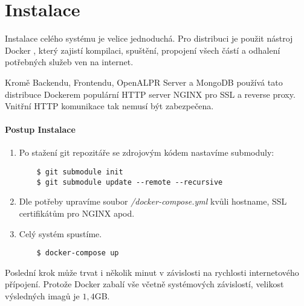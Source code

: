 
\chapter{Instalace} \label{analyza}

Instalace celého systému je velice jednoduchá. Pro distribuci je použit nástroj
Docker \citep[viz][]{DockerDocs}, který zajistí kompilaci, spuštění, propojení všech částí a odhalení
potřebných služeb ven na internet.

Kromě Backendu, Frontendu, OpenALPR Server a MongoDB používá tato distribuce
Dockerem populární HTTP server NGINX pro SSL a reverse proxy. Vnitřní HTTP komunikace
tak nemusí být zabezpečena.

\subsubsection*{Postup Instalace}

\begin{enumerate}
  \item Po stažení git repozitáře se zdrojovým kódem nastavíme submoduly:\\
  \begin{lstlisting}
    $ git submodule init
    $ git submodule update --remote --recursive
  \end{lstlisting}
  \item Dle potřeby upravíme soubor \textit{/docker-compose.yml} kvůli hostname, SSL certifikátům pro NGINX apod.
  \item Celý systém spustíme.\\
  \begin{lstlisting}
    $ docker-compose up
  \end{lstlisting}
\end{enumerate}

Poslední krok může trvat i několik minut v závislosti na rychlosti internetového
přípojení. Protože Docker zabalí vše včetně systémových závislostí, velikost
výsledných imagů je $1,4$GB.
